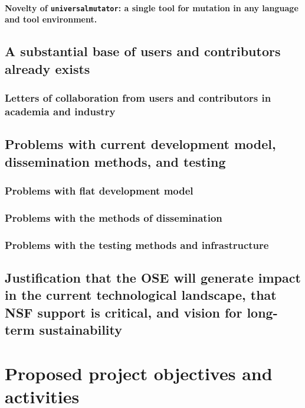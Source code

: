 \documentclass[numbers]{proposalnsf}
\newcommand{\um}{\texttt{universalmutator}}
\begin{document}
\paragraph{Novelty of \um: a single tool for mutation in any language and tool environment.}



\subsection{A substantial base of users and contributors already exists}

\subsubsection{Letters of collaboration from users and contributors in academia and industry}


\subsection{Problems with current development model, dissemination methods, and testing}

\subsubsection{Problems with flat development model}

\subsubsection{Problems with the methods of dissemination}

\subsubsection{Problems with the testing methods and infrastructure}

\subsection{Justification that the OSE will generate impact in the current technological landscape, that NSF support is critical, and vision for long-term sustainability}

\section{Proposed project objectives and activities}
\end{document}
